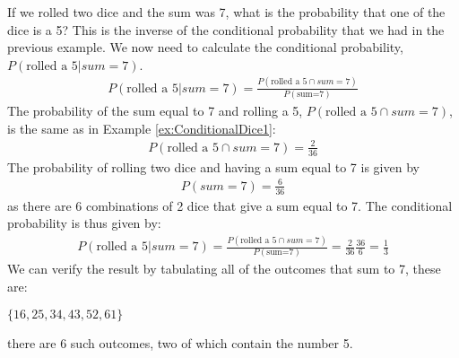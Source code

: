 \begin{example}{If we rolled two dice and the sum was 7, what is the probability that one of the dice is a 5?}
\label{ex:ConditionalDice2}
This is the inverse of the conditional probability that we had in the previous example. We now need to calculate the conditional probability, $P(\text{rolled a 5}|sum=7)$.
\begin{align}
P(\text{rolled a 5}|sum=7)=\frac{P( \text{rolled a 5} \cap sum=7)}{P(\text{sum=7})}
\end{align}
The probability of the sum equal to 7 and rolling a 5, $P( \text{rolled a 5} \cap sum=7)$, is the same as in Example \ref{ex:ConditionalDice1}:
\begin{align}
P( \text{rolled a 5} \cap sum=7)=\frac{2}{36}
\end{align}
The probability of rolling two dice and having a sum equal to 7 is given by
\begin{align}
P(sum=7)=\frac{6}{36}
\end{align}
as there are 6 combinations of 2 dice that give a sum equal to 7. The conditional probability is thus given by:
\begin{align}
P(\text{rolled a 5}|sum=7)=\frac{P( \text{rolled a 5} \cap sum=7)}{P(\text{sum=7})}=\frac{2}{36}\frac{36}{6}=\frac{1}{3}
\end{align}
We can verify the result by tabulating all of the outcomes that sum to 7, these are:

$\{16,25,34,43,52,61\}$
 
there are 6 such outcomes, two of which contain the number 5. 
\end{example}


